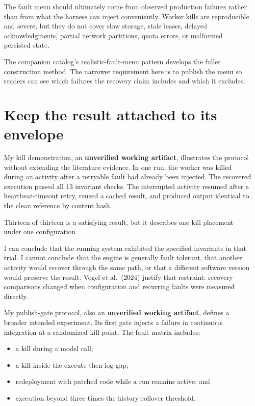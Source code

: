 The fault menu should ultimately come from observed production failures rather than from what the harness can inject conveniently. Worker kills are reproducible and severe, but they do not cover slow storage, stale leases, delayed acknowledgments, partial network partitions, quota errors, or malformed persisted state.

The companion catalog's realistic-fault-menu pattern develops the fuller construction method. The narrower requirement here is to publish the menu so readers can see which failures the recovery claim includes and which it excludes.

\section{Keep the result attached to its envelope}\label{keep-the-result-attached-to-its-envelope}

My kill demonstration, an \textbf{unverified working artifact}, illustrates the protocol without extending the literature evidence. In one run, the worker was killed during an activity after a retryable fault had already been injected. The recovered execution passed all 13 invariant checks. The interrupted activity resumed after a heartbeat-timeout retry, reused a cached result, and produced output identical to the clean reference by content hash.

Thirteen of thirteen is a satisfying result, but it describes one kill placement under one configuration.

I can conclude that the running system exhibited the specified invariants in that trial. I cannot conclude that the engine is generally fault tolerant, that another activity would recover through the same path, or that a different software version would preserve the result. Vogel et al.~(2024) justify that restraint: recovery comparisons changed when configuration and recurring faults were measured directly.

My publish-gate protocol, also an \textbf{unverified working artifact}, defines a broader intended experiment. Its first gate injects a failure in continuous integration at a randomized kill point. The fault matrix includes:

\begin{itemize}
\tightlist
\item
  a kill during a model call;
\item
  a kill inside the execute-then-log gap;
\item
  redeployment with patched code while a run remains active; and
\item
  execution beyond three times the history-rollover threshold.
\end{itemize}

